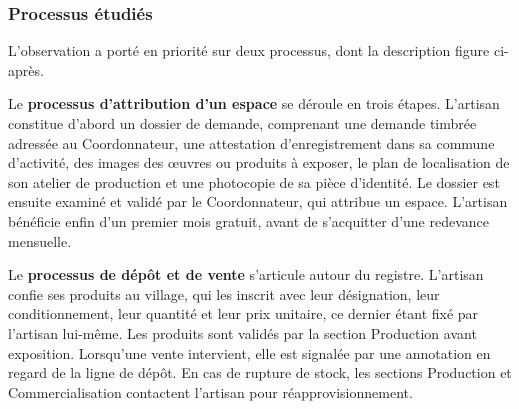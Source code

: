 \subsubsection{Processus étudiés}

L'observation a porté en priorité sur deux processus, dont la description figure ci-après.

Le \textbf{processus d'attribution d'un espace} se déroule en trois étapes. L'artisan constitue d'abord un dossier de demande, comprenant une demande timbrée adressée au Coordonnateur, une attestation d'enregistrement dans sa commune d'activité, des images des œuvres ou produits à exposer, le plan de localisation de son atelier de production et une photocopie de sa pièce d'identité. Le dossier est ensuite examiné et validé par le Coordonnateur, qui attribue un espace. L'artisan bénéficie enfin d'un premier mois gratuit, avant de s'acquitter d'une redevance mensuelle.

Le \textbf{processus de dépôt et de vente} s'articule autour du registre. L'artisan confie ses produits au village, qui les inscrit avec leur désignation, leur conditionnement, leur quantité et leur prix unitaire, ce dernier étant fixé par l'artisan lui-même. Les produits sont validés par la section Production avant exposition. Lorsqu'une vente intervient, elle est signalée par une annotation en regard de la ligne de dépôt. En cas de rupture de stock, les sections Production et Commercialisation contactent l'artisan pour réapprovisionnement.

